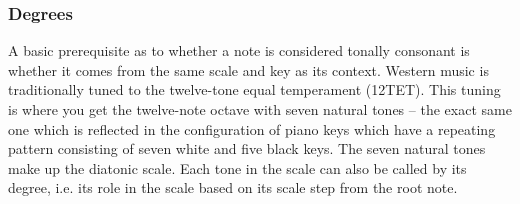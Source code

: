 \subsubsection{Degrees}

A basic prerequisite as to whether a note is considered tonally consonant is whether it
comes from the same scale and key as its context. Western music is traditionally tuned to
the twelve-tone equal temperament (12TET). This tuning is where you get the twelve-note
octave with seven natural tones -- the exact same one which is reflected in the
configuration of piano keys which have a repeating pattern consisting of seven white and
five black keys. The seven natural tones make up the diatonic scale. Each tone in the
scale can also be called by its degree, i.e. its role in the scale based on its scale step
from the root note.

